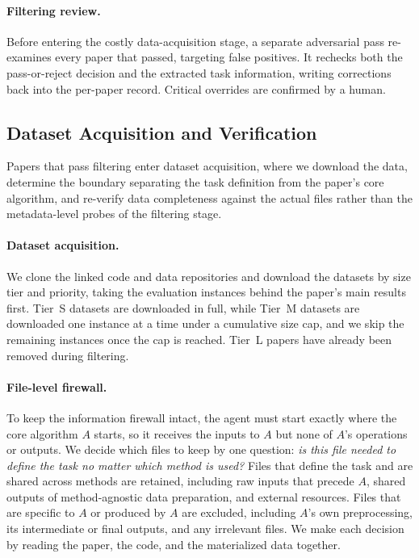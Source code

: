 \paragraph{Filtering review.}
Before entering the costly data-acquisition stage, a separate adversarial pass re-examines every paper that passed, targeting false positives.
It rechecks both the pass-or-reject decision and the extracted task information, writing corrections back into the per-paper record. Critical overrides are confirmed by a human.


\subsection{Dataset Acquisition and Verification}
\label{sec:gym:data}


Papers that pass filtering enter dataset acquisition, where we download the data, determine the boundary separating the task definition from the paper's core algorithm, and re-verify data completeness against the actual files rather than the metadata-level probes of the filtering stage.

\paragraph{Dataset acquisition.}
We clone the linked code and data repositories and download the datasets by size tier and priority, taking the evaluation instances behind the paper's main results first.
Tier~S datasets are downloaded in full, while Tier~M datasets are downloaded one instance at a time under a cumulative size cap, and we skip the remaining instances once the cap is reached. Tier~L papers have already been
removed during filtering.

\paragraph{File-level firewall.}
To keep the information firewall intact, the agent must start exactly where the core algorithm $A$ starts, so it receives the inputs to $A$ but none of $A$'s operations or outputs.
We decide which files to keep by one question: \emph{is this file needed to define the task no matter which method is used?}
Files that define the task and are shared across methods are retained, including raw inputs that precede $A$, shared outputs of method-agnostic data preparation, and external resources.
Files that are specific to $A$ or produced by $A$ are excluded, including $A$'s own preprocessing, its intermediate or final outputs, and any irrelevant files.
We make each decision by reading the paper, the code, and the materialized data together.

